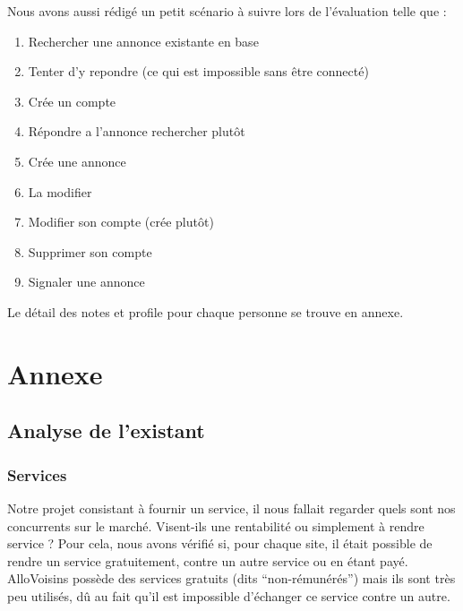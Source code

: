 \documentclass[a4paper,11pt]{article}
\begin{document}
Nous avons aussi rédigé un petit scénario à suivre lors de l'évaluation telle que :
\begin{enumerate}
  \item Rechercher une annonce existante en base
  \item Tenter d'y repondre (ce qui est impossible sans être connecté)
  \item Crée un compte
  \item Répondre a l'annonce rechercher plutôt
  \item Crée une annonce
  \item La modifier
  \item Modifier son compte (crée plutôt)
  \item Supprimer son compte
  \item Signaler une annonce
\end{enumerate}

Le détail des notes et profile pour chaque personne se trouve en annexe.


\newpage




\section{Annexe}

\subsection{Analyse de l'existant}

\subsubsection{Services}

Notre projet consistant à fournir un service, il nous fallait regarder quels sont nos concurrents sur le marché.
Visent-ils une rentabilité ou simplement à rendre service ? Pour cela, nous avons vérifié si, pour chaque site,
il était possible de rendre un service gratuitement, contre un autre service ou en étant payé.\\

AlloVoisins possède des services gratuits (dits “non-rémunérés”) mais ils sont très peu utilisés,
dû au fait qu’il est impossible d’échanger ce service contre un autre.\\
\end{document}
